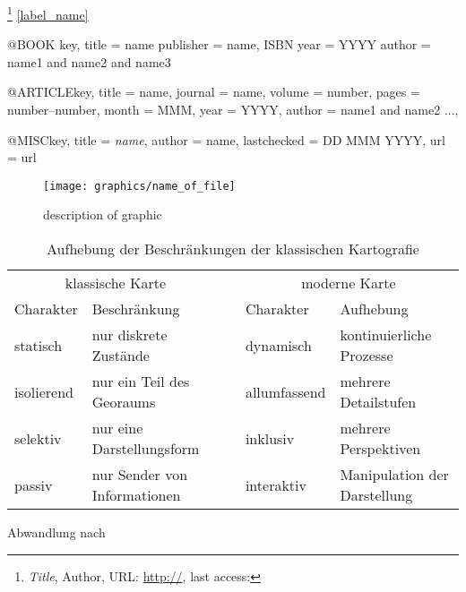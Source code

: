 \footnote{
  \textit{Title},
  Author,
  URL: \url{http://},
  last access:
}
\cite{source_id}    %
\ref{label_name}    %

@BOOK {key,
  title = {{name}}
  publisher = {name, ISBN}
  year = {YYYY}
  author = {name1 and name2 and name3}
}

@ARTICLE{key,
  title = {{name}},
  journal = {name},
  volume = {number},
  pages = {number--number},
  month = {MMM},
  year = {YYYY},
  author = {name1 and name2 ...},
}

@MISC{key,
  title       = {\emph{name}},
  author      = {{name}},
  lastchecked = {DD MMM YYYY},
  url         = {url}
}

\begin{figure}[ht]  %
    \begin{center}
        \texttt{[image: graphics/name\_of\_file]}
    \end{center}
    \caption{description of graphic}
    \label{fig:graphics_name}
\end{figure}

\begin{table}[ht]
\centering
\begin{tabular}{llp{1em}ll}
    \toprule
    \multicolumn{2}{c}{klassische Karte} & & \multicolumn{2}{c}{moderne Karte} \\
    Charakter & Beschränkung & & Charakter & Aufhebung \\
    \midrule
    statisch & nur diskrete Zustände & & dynamisch & kontinuierliche Prozesse \\
    isolierend & nur ein Teil des Georaums & & allumfassend & mehrere Detailstufen \\
    selektiv & nur eine Darstellungsform & & inklusiv & mehrere Perspektiven \\
    passiv & nur Sender von Informationen & & interaktiv & Manipulation der Darstellung \\
    \bottomrule
\end{tabular}
\caption{Aufhebung der Beschränkungen der klassischen Kartografie}
\label{tab:kartografie}
{\small Abwandlung nach \cite{karcher}}
\end{table}


\vspace{-1em}       %
\newpage            %

